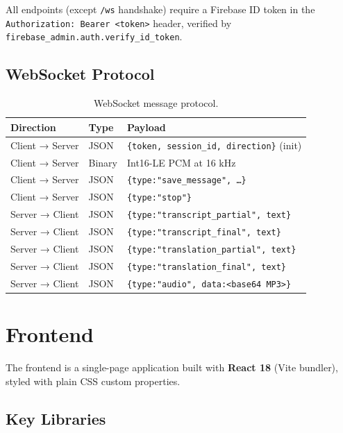 \documentclass[12pt,a4paper]{report}
\begin{document}
All endpoints (except \texttt{/ws} handshake) require a Firebase ID
token in the \texttt{Authorization: Bearer <token>} header, verified by
\texttt{firebase\_admin.auth.verify\_id\_token}.

\subsection{WebSocket Protocol}

\begin{table}[H]
  \centering
  \begin{tabular}{lll}
    \toprule
    \textbf{Direction} & \textbf{Type} & \textbf{Payload} \\
    \midrule
    Client → Server & JSON  & \texttt{\{token, session\_id, direction\}} (init) \\
    Client → Server & Binary & Int16-LE PCM at 16 kHz \\
    Client → Server & JSON  & \texttt{\{type:"save\_message", \ldots\}} \\
    Client → Server & JSON  & \texttt{\{type:"stop"\}} \\
    \midrule
    Server → Client & JSON  & \texttt{\{type:"transcript\_partial", text\}} \\
    Server → Client & JSON  & \texttt{\{type:"transcript\_final", text\}} \\
    Server → Client & JSON  & \texttt{\{type:"translation\_partial", text\}} \\
    Server → Client & JSON  & \texttt{\{type:"translation\_final", text\}} \\
    Server → Client & JSON  & \texttt{\{type:"audio", data:<base64 MP3>\}} \\
    \bottomrule
  \end{tabular}
  \caption{WebSocket message protocol.}
\end{table}

\section{Frontend}

The frontend is a single-page application built with \textbf{React 18}
(Vite bundler), styled with plain CSS custom properties.

\subsection{Key Libraries}
\end{document}
